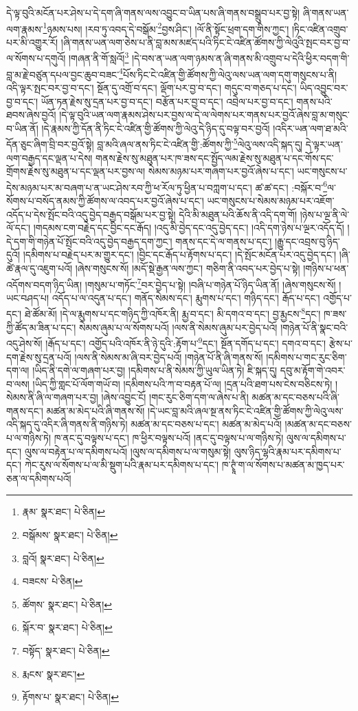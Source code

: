 དེ་ལྟ་བུའི་མངོན་པར་ཤེས་པ་དེ་དག་ཞི་གནས་ལས་འབྱུང་བ་ཡིན་པས་ཞི་གནས་བསྒྲུབ་པར་བྱ་སྟེ། ཞི་གནས་ཡན་ལག་རྣམས་\footnote{རྣམ་  སྣར་ཐང་།  པེ་ཅིན། }ཉམས་པས། །རབ་ཏུ་འབད་དེ་བསྒོམ་\footnote{བསྒོམས་  སྣར་ཐང་།  པེ་ཅིན། }བྱས་ཤིང་། །ལོ་ནི་སྟོང་ཕྲག་དག་གིས་ཀྱང་། །ཏིང་འཛིན་འགྲུབ་པར་མི་འགྱུར་རོ། །ཞི་གནས་ཡན་ལག་ཅེས་པ་ནི་བླ་མས་མཛད་པའི་ཏིང་ངེ་འཛིན་ཚོགས་ཀྱི་ལེའུའི་སྤང་བར་བྱ་བ་ལ་སོགས་པ་དགུའོ། །གཞན་ནི་གོ་སླའོ།\footnote{བླའོ།  སྣར་ཐང་།  པེ་ཅིན། } །དེ་བས་ན་ཡན་ལག་ཉམས་ན་ཞི་གནས་མི་འགྲུབ་པ་དེའི་ཕྱིར་བདག་གི་བླ་མ་རྗེ་བཙུན་དཔལ་བྱང་ཆུབ་བཟང་\footnote{བཟངས་  པེ་ཅིན། }པོས་ཏིང་ངེ་འཛིན་གྱི་ཚོགས་ཀྱི་ལེའུ་ལས་ཡན་ལག་དགུ་གསུངས་པ་ནི། འདི་ལྟར་སྤང་བར་བྱ་བ་དང་། སྔོན་དུ་འགྲོ་བ་དང་། ལྡོག་པར་བྱ་བ་དང་། གདུང་བ་གཅད་པ་དང་། ཡིད་འབྱུང་བར་བྱ་བ་དང་། ཡོན་ཏན་རྗེས་སུ་དྲན་པར་བྱ་བ་དང་། བརྩོན་པར་བྱ་བ་དང་། འབྲེལ་པར་བྱ་བ་དང་། གནས་པའི་ཐབས་ཞེས་བྱའོ། །དེ་ལྟ་བུའི་ཡན་ལག་རྣམས་ཤེས་པར་བྱས་ལ་དེ་ལ་ལེགས་པར་གནས་པར་བྱའོ་ཞེས་བླ་མ་གསུང་བ་ཡིན་ནོ། །དེ་རྣམས་ཀྱི་དོན་ནི་ཏིང་ངེ་འཛིན་གྱི་ཚོགས་ཀྱི་ལེའུ་དེ་ཉིད་དུ་བལྟ་བར་བྱའོ། །འདིར་ཡན་ལག་ཐ་མའི་དོན་ཅུང་ཞིག་བྲི་བར་བྱའོ་སྟེ། བླ་མའི་ཞལ་ནས་ཏིང་ངེ་འཛིན་གྱི་:ཚོགས་ཀྱི་\footnote{ཚོགས་  སྣར་ཐང་།  པེ་ཅིན། }ལེའུ་ལས་འདི་སྐད་དུ། དེ་ལྟར་ཡན་ལག་བརྒྱད་དང་ལྡན་པ་དེས། གནས་རྗེས་སུ་མཐུན་པར་ཁ་ཟས་དང་སྤྱོད་ལམ་རྗེས་སུ་མཐུན་པ་དང་གོས་དང་གྲོགས་རྗེས་སུ་མཐུན་པ་དང་ལྡན་པར་བྱས་ལ། སེམས་མཉམ་པར་གཞག་པར་བྱའོ་ཞེས་པ་དང་། ཡང་གསུངས་པ་དེས་མཉམ་པར་མ་བཞག་པ་ན་ཡང་ཤེས་རབ་ཀྱི་ཕ་རོལ་ཏུ་ཕྱིན་པ་བཀླག་པ་དང་། ཚ་ཚ་དང་། :བསྐོར་བ་\footnote{སྐོར་བ་  སྣར་ཐང་།  པེ་ཅིན། }ལ་སོགས་པ་བསོད་ནམས་ཀྱི་ཚོགས་ལ་འབད་པར་བྱའོ་ཞེས་པ་དང་། ཡང་གསུངས་པ་སེམས་མཉམ་པར་འཇོག་འདོད་པ་དེས་སྤོང་བའི་འདུ་བྱེད་བརྒྱད་བསྒོམ་པར་བྱ་སྟེ། དེའི་མི་མཐུན་པའི་ཆོས་ནི་འདི་དག་གོ། །ཉེས་པ་ལྔ་ནི་ལེ་ལོ་དང་། །གདམས་ངག་བརྗེད་དང་བྱིང་དང་རྒོད། །འདུ་མི་བྱེད་དང་འདུ་བྱེད་དང་། །འདི་དག་ཉེས་པ་ལྔར་འདོད་དོ། །དེ་དག་གི་གཉེན་པོ་སྤོང་བའི་འདུ་བྱེད་བརྒྱད་དག་ཀྱང་། གནས་དང་དེ་ལ་གནས་པ་དང་། །རྒྱུ་དང་འབྲས་བུ་ཉིད་དུའོ། །དམིགས་པ་བརྗེད་པར་མ་གྱུར་དང་། །བྱིང་དང་རྒོད་པ་རྟོགས་པ་དང་། །དེ་སྤོང་མངོན་པར་འདུ་བྱེད་དང་། །ཞི་ཚེ་རྣལ་དུ་འཇུག་པའོ། །ཞེས་གསུངས་སོ། །མདོ་སྡེ་རྒྱན་ལས་ཀྱང་། གཅིག་ནི་འབད་པར་བྱེད་པ་སྟེ། །གཉིས་པ་ཕན་འདོགས་བདག་ཉིད་ཡིན། །གསུམ་པ་གཏོང་\footnote{བསྟོད་  སྣར་ཐང་།  པེ་ཅིན། }བར་བྱེད་པ་སྟེ། །བཞི་པ་གཉེན་པོ་ཉིད་ཡིན་ནོ། །ཞེས་གསུངས་སོ། །ཡང་བཤད་པ། འདོད་པ་ལ་འདུན་པ་དང་། གནོད་སེམས་དང་། རྨུགས་པ་དང་། གཉིད་དང་། རྒོད་པ་དང་། འགྱོད་པ་དང་། ཐེ་ཚོམ་མོ། །དེ་ལ་རྨུགས་པ་དང་གཉིད་ཀྱི་འཁོར་ནི། རྨྱ་བ་དང་། མི་དགའ་བ་དང་། བྱ་རྨྱངས་\footnote{རྨངས་  སྣར་ཐང་། }དང་། ཁ་ཟས་ཀྱི་ཚོད་མ་ཟིན་པ་དང་། སེམས་ཞུམ་པ་ལ་སོགས་པའོ། །ལས་ནི་སེམས་ཞུམ་པར་བྱེད་པའོ། །གཉེན་པོ་ནི་སྣང་བའི་འདུ་ཤེས་སོ། །རྒོད་པ་དང་། འགྱོད་པའི་འཁོར་ནི་ཉེ་དུའི་:རྟོག་པ་\footnote{རྟོགས་པ་  སྣར་ཐང་།  པེ་ཅིན། }དང་། སྔོན་དགོད་པ་དང་། དགའ་བ་དང་། རྩེས་པ་དག་རྗེས་སུ་དྲན་པའོ། །ལས་ནི་སེམས་མ་ཞི་བར་བྱེད་པའོ། །གཉེན་པོ་ནི་ཞི་གནས་སོ། །དམིགས་པ་གང་རུང་ཅིག་དག་ལ། །ཡིད་ནི་དགེ་ལ་གཞག་པར་བྱ། །དམིགས་པ་ནི་སེམས་ཀྱི་ཡུལ་ཡིན་ཏེ། ཇི་སྐད་དུ། དབུ་མ་རྟོག་གེ་འབར་བ་ལས། །ཡིད་ཀྱི་གླང་པོ་ལོག་གཡོ་བ། །དམིགས་པའི་ཀ་བ་བརྟན་པོ་ལ། །དྲན་པའི་ཐག་པས་ངེས་བཅིངས་ཏེ། །སེམས་ནི་ཞི་ལ་གཞག་པར་བྱ། །ཞེས་འབྱུང་ངོ། །གང་རུང་ཅིག་དག་ལ་ཞེས་པ་ནི། མཚན་མ་དང་བཅས་པའི་ཞི་གནས་དང་། མཚན་མ་མེད་པའི་ཞི་གནས་སོ། །དེ་ཡང་བླ་མའི་ཞལ་སྔ་ནས་ཏིང་ངེ་འཛིན་གྱི་ཚོགས་ཀྱི་ལེའུ་ལས་འདི་སྐད་དུ་འདིར་ཞི་གནས་ནི་གཉིས་ཏེ། མཚན་མ་དང་བཅས་པ་དང་། མཚན་མ་མེད་པའོ། །མཚན་མ་དང་བཅས་པ་ལ་གཉིས་ཏེ། ཁ་ནང་དུ་བལྟས་པ་དང་། ཁ་ཕྱིར་བལྟས་པའོ། །ནང་དུ་བལྟས་པ་ལ་གཉིས་ཏེ། ལུས་ལ་དམིགས་པ་དང་། ལུས་ལ་བརྟེན་པ་ལ་དམིགས་པའོ། །ལུས་ལ་དམིགས་པ་ལ་གསུམ་སྟེ། ལུས་ཉིད་ལྷའི་རྣམ་པར་དམིགས་པ་དང་། ཀེང་རུས་ལ་སོགས་པ་ལ་མི་སྡུག་པའི་རྣམ་པར་དམིགས་པ་དང་། ཁ་ཊྭཱཾ་ག་ལ་སོགས་པ་མཚན་མ་ཁྱད་པར་ཅན་ལ་དམིགས་པའོ། 